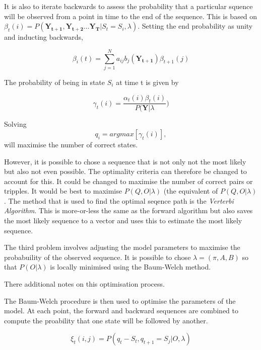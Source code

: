 \documentclass[12pt, a4paper, oneside]{article} %
\begin{document}
It is also to iterate backwards to assess the probability that a particular squence will be observed from a point in time to the end of the sequence.  This is based on $\beta_t(i) = P(\mathbf{Y_{t+1}}, \mathbf{Y_{t+2}}\dots \mathbf{Y_T}| S_t = S_i, \lambda)$. Setting the end probability as unity and inducting backwards, 

\begin{equation} 
\beta_i(t) = \sum_{j = 1}^N a_{ij}b_j(\mathbf{Y_{t+1}})\beta_{t+1}(j)
\end{equation}

The probability of being in state $S_i$ at time t is given by 

\begin{equation}
\gamma_t(i) = \frac{\alpha_t(i)\beta_t(i)}{P(\mathbf{Y}|\lambda})
\end{equation}

Solving
\begin{equation}
q_i = argmax [\gamma_t(i)], %
\end{equation}
will maximise the number of correct states. 

However, it is possible to chose a sequence that is not only not the most likely but also not even possible.  The optimality criteria can therefore be changed to account for this.  It could be changed to maximise the number of correct pairs or tripples. It would be best to maximise $P(Q, O |\lambda)$ (the equivalent of $P(Q, O| \lambda)$.  The method that is used to find the optimal seqence path is the \emph{Verterbi Algorithm}.  This is more-or-less the same as the forward algorithm but also saves the most likely sequence to a vector and uses this to estimate the most likely sequence. 

The third problem involves adjusting the model parameters to maximise the probabuility of the observed sequence. It is possible to chose $\lambda = (\pi, A, B)$ so that $P(O|\lambda)$ is locally minimised using the Baum-Welch method. 

There additional notes on this optimisation process. 

The Baum-Welch procedure is then used to optimise the parameters of the model.  At each point, the forward and backward sequences are combined to compute the proability that one state will be followed by another. 

\begin{equation}
\xi_t(i,j) = P(q_t - S_t, q_{t+1} = S_j| O, \lambda)
\end{equation}
\end{document}
